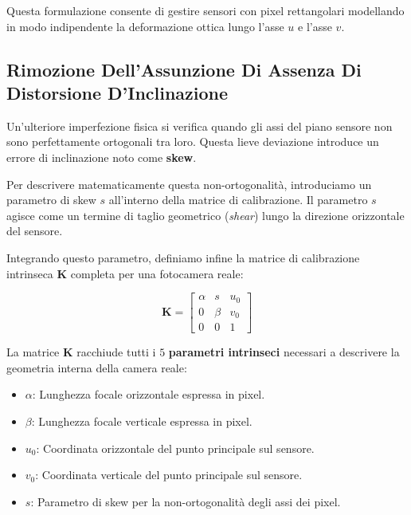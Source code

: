 ﻿\documentclass[11pt, a4paper]{article}
\begin{document}
Questa formulazione consente di gestire sensori con pixel rettangolari modellando in modo indipendente la deformazione ottica lungo l'asse $u$ e l'asse $v$.



\subsection{Rimozione Dell'Assunzione Di Assenza Di Distorsione D'Inclinazione}

Un'ulteriore imperfezione fisica si verifica quando gli assi del piano sensore non sono perfettamente ortogonali tra loro. Questa lieve deviazione introduce un errore di inclinazione noto come \textbf{skew}.


Per descrivere matematicamente questa non-ortogonalità, introduciamo un parametro di skew $s$ all'interno della matrice di calibrazione. Il parametro $s$ agisce come un termine di taglio geometrico (\emph{shear}) lungo la direzione orizzontale del sensore.

Integrando questo parametro, definiamo infine la matrice di calibrazione intrinseca $\bm{K}$ completa per una fotocamera reale:

\begin{equation}
\bm{K} = \begin{bmatrix} \alpha & s & u_0 \\ 0 & \beta & v_0 \\ 0 & 0 & 1 \end{bmatrix}
\end{equation}


La matrice $\bm{K}$ racchiude tutti i $5$ \textbf{parametri intrinseci} necessari a descrivere la geometria interna della camera reale:
\begin{itemize}[noitemsep]
    \item $\alpha$: Lunghezza focale orizzontale espressa in pixel.
    \item $\beta$: Lunghezza focale verticale espressa in pixel.
    \item $u_0$: Coordinata orizzontale del punto principale sul sensore.
    \item $v_0$: Coordinata verticale del punto principale sul sensore.
    \item $s$: Parametro di skew per la non-ortogonalità degli assi dei pixel.
\end{itemize}
\end{document}
